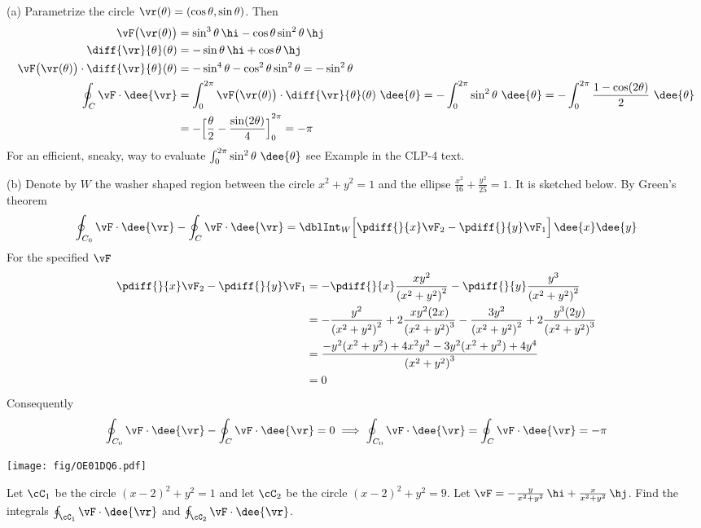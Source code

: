 \begin{solution}
(a) Parametrize the circle $\vr(\theta)=(\cos\theta,\sin\theta)$. Then
\begin{align*}
\vF\big(\vr(\theta)\big)
&=\sin^3\theta\,\hi -\cos\theta \sin^2\theta\,\hj\\
\diff{\vr}{\theta}(\theta)&=-\sin\theta\,\hi+\cos\theta\,\hj\\
\vF\big(\vr(\theta)\big)\cdot \diff{\vr}{\theta}(\theta)
&=-\sin^4\theta-\cos^2\theta\sin^2\theta=-\sin^2\theta\\
\oint_C\vF\cdot \dee{\vr}
&=\int_0^{2\pi}\vF\big(\vr(\theta)\big)\cdot \diff{\vr}{\theta}(\theta)\ \dee{\theta}
=-\int_0^{2\pi}\sin^2\theta\ \dee{\theta}
=-\int_0^{2\pi}\frac{1-\cos(2\theta)}{2}\ \dee{\theta}\\
&=-{\Big[\frac{\theta}{2}-\frac{\sin(2\theta)}{4}\Big]}_0^{2\pi}
=-\pi
\end{align*}
For an efficient, sneaky, way to evaluate
$\int_0^{2\pi} \sin^2\theta\ \dee{\theta}$ see Example
 in the CLP-4 text.

(b) Denote by $W$ the washer shaped region between the circle
$x^2+y^2=1$ and the ellipse $\frac{x^2}{16}+\frac{y^2}{25}=1$.
It is sketched below. By Green's theorem
\begin{align*}
\oint_{C_0}\vF\cdot \dee{\vr}-\oint_C\vF\cdot \dee{\vr}
=\dblInt_W \Big[\pdiff{}{x}\vF_2
-\pdiff{}{y}\vF_1\Big]\,\dee{x}\dee{y}
\end{align*}
For the specified $\vF$
\begin{align*}
\pdiff{}{x}\vF_2
-\pdiff{}{y}\vF_1
&=-\pdiff{}{x}\frac{xy^2}{ {(x^2+y^2)}^2}
-\pdiff{}{y}\frac{y^3}{ {(x^2+y^2)}^2}\\
&=-\frac{y^2}{ {(x^2+y^2)}^2}+2\frac{xy^2(2x)}{ {(x^2+y^2)}^3}
-\frac{3y^2}{ {(x^2+y^2)}^2}+2\frac{y^3(2y)}{ {(x^2+y^2)}^3}\\
&=\frac{-y^2(x^2+y^2)+4x^2y^2-3y^2(x^2+y^2)+4y^4}{ {(x^2+y^2)}^3}\\
&=0
\end{align*}
Consequently
$$
\oint_{C_0}\vF\cdot \dee{\vr}-\oint_C\vF\cdot \dee{\vr}=0
\implies
\oint_{C_0}\vF\cdot \dee{\vr}=\oint_C\vF\cdot \dee{\vr}=-\pi
$$

\begin{center}
   \texttt{[image: fig/OE01DQ6.pdf]}
\end{center}

\end{solution}

\begin{question}[M317 2001A] %
Let $\cC_1$ be the circle $(x-2)^2+y^2=1$ and let $\cC_2$ be
the circle $(x-2)^2+y^2=9$. Let
$\vF=-\frac{y}{x^2+y^2}\,\hi+\frac{x}{x^2+y^2}\,\hj$. Find the integrals
$\oint_{\cC_1}\vF\cdot \dee{\vr}$ and $\oint_{\cC_2}\vF\cdot \dee{\vr}$.
\end{question}

